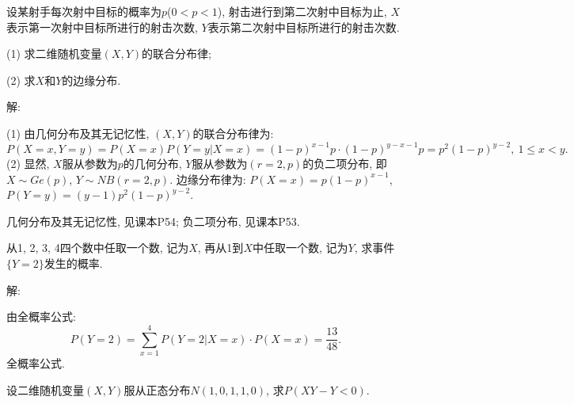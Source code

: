 \documentclass[standard]{ExBook}
\renewenvironment{shaded}{%
  \def\FrameCommand{\fboxsep=\FrameSep \colorbox{shadecolor}}%
  \MakeFramed{\advance\hsize-\width \FrameRestore}%
}{%
  \endMakeFramed
}
\begin{document}
\begin{qitems}
    \begin{bbox}
    \begin{shaded}
        \qitem
设某射手每次射中目标的概率为$p$($0 < p < 1$), 射击进行到第二次射中目标为止, $X$表示第一次射中目标所进行的射击次数, $Y$表示第二次射中目标所进行的射击次数.

(1) 求二维随机变量$(X,Y)$的联合分布律;

(2) 求$X$和$Y$的边缘分布.
    \end{shaded}
    \end{bbox}

\vspace{\dimexpr2.5cm-5em\relax}

解: 

(1) 由几何分布及其无记忆性, $(X,Y)$的联合分布律为:
$$P(X=x,Y=y)=P(X=x)P(Y=y|X=x)=(1-p)^{x-1}p\cdot(1-p)^{y-x-1}p=p^2(1-p)^{y-2},\ 1\leq x<y.$$
(2) 显然, $X$服从参数为$p$的几何分布, $Y$服从参数为$(r=2, p)$的负二项分布, 即$X\sim Ge(p)$, $Y\sim NB(r=2,p)$. 边缘分布律为: $P(X=x)=p(1-p)^{x-1}$, $P(Y=y)=(y-1)p^2(1-p)^{y-2}$.

\textcolor{themeColor}{\selectfont {} 几何分布及其无记忆性, 见课本P54; 负二项分布, 见课本P53.}

\vspace{2.5cm-5em}

    \begin{bbox}
    \begin{shaded}
        \qitem
从1, 2, 3, 4四个数中任取一个数, 记为$X$, 再从1到$X$中任取一个数, 记为$Y$, 求事件$\{Y=2\}$发生的概率.
    \end{shaded}
    \end{bbox}

\vspace{\dimexpr2.5cm-5em\relax}

解: 

由全概率公式:
$$P(Y=2)=\sum\limits_{x=1}^{4}P(Y=2|X=x)\cdot P(X=x)=\frac{13}{48}.$$
\textcolor{themeColor}{\selectfont {} 全概率公式.}

\vspace{2.5cm-5em}

    \begin{bbox}
    \begin{shaded}
        \qitem
设二维随机变量$(X,Y)$服从正态分布$N(1,0,1,1,0)$, 求$P(XY-Y<0)$.
    \end{shaded}
    \end{bbox}

\vspace{\dimexpr2.5cm-5em\relax}


\end{qitems}
\end{document}
